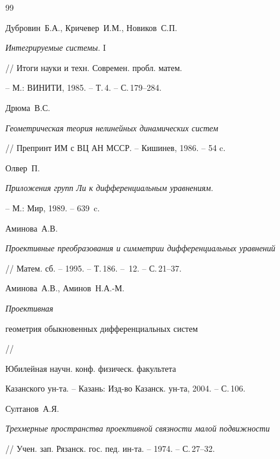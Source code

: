 \begin{thebibliography}{99}


Дубровин~Б.А., Кричевер~И.М., Новиков~С.П.


{\em Интегрируемые системы}. I


// Итоги науки и техн. Современ. пробл. матем.


-- М.: ВИНИТИ, 1985. -- Т.\,4. -- С.\,179--284.







Дрюма~В.С.


{\em Геометрическая теория нелинейных динамических систем}


// Препринт ИМ с ВЦ АН МССР. -- Кишинев, 1986. -- 54 c.







Олвер~П.


{\em Приложения групп Ли к дифференциальным уравнениям}.


-- М.: Мир, 1989. -- 639~c.







Аминова~А.В.


{\em  Проективные преобразования и симметрии дифференциальных уравнений}


// Матем. сб. -- 1995. -- Т.\,186. -- \No\,12. -- С.\,21--37.







Аминова~А.В., Аминов~Н.А.-М. {\em Проективная


геометрия обыкновенных дифференциальных систем} // 


Юбилейная научн. конф. физическ. факультета 


Казанского ун-та. -- Казань: Изд-во Казанск. ун-та, 2004. -- С.\,106.










Султанов~А.Я.


{\em Трехмерные пространства проективной связности малой подвижности}


// Учен. зап. Рязанск. гос. пед. ин-та. -- 1974. -- С.\,27--32.






\end{thebibliography}
